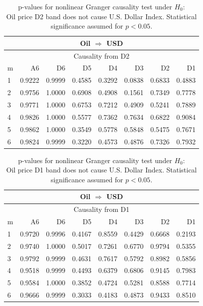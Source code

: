 %
%
\begin{table}[H]
\begin{center}
\begin{tabular}{l|r r r r r r r}
\hline\hline
\multicolumn{8}{c}{Oil $\Rightarrow$ USD}\\
\hline
\multicolumn{8}{c}{Causality from D2}\\
\hline\hline
m & A6 & D6 & D5 & D4 & D3 & D2 & D1 \\
\hline
1 & 0.9222 & 0.9999 & 0.4585 & 0.3292 & 0.0838 & 0.6833 & 0.4883 \\
2 & 0.9756 & 1.0000 & 0.6908 & 0.4908 & 0.1561 & 0.7349 & 0.7778 \\
3 & 0.9771 & 1.0000 & 0.6753 & 0.7212 & 0.4909 & 0.5241 & 0.7889 \\
4 & 0.9826 & 1.0000 & 0.5577 & 0.7362 & 0.7634 & 0.6822 & 0.9084 \\
5 & 0.9862 & 1.0000 & 0.3549 & 0.5778 & 0.5848 & 0.5475 & 0.7671 \\
6 & 0.9824 & 0.9999 & 0.3220 & 0.4573 & 0.4876 & 0.7326 & 0.7932 \\
\hline\hline
\end{tabular}
\caption{p-values for nonlinear Granger causality test under $H_0$:\\
Oil price D2 band does not cause U.S. Dollar Index. Statistical significance assumed for $p<0.05$.}
\end{center}
\end{table}

%
%
\begin{table}[H]
\begin{center}
\begin{tabular}{l|r r r r r r r}
\hline\hline
\multicolumn{8}{c}{Oil $\Rightarrow$ USD}\\
\hline
\multicolumn{8}{c}{Causality from D1}\\
\hline\hline
m & A6 & D6 & D5 & D4 & D3 & D2 & D1 \\
\hline
1 & 0.9720 & 0.9996 & 0.4167 & 0.8559 & 0.4429 & 0.6668 & 0.2193 \\
2 & 0.9740 & 1.0000 & 0.5017 & 0.7261 & 0.6770 & 0.9794 & 0.5355 \\
3 & 0.9792 & 0.9999 & 0.4631 & 0.7617 & 0.5792 & 0.8982 & 0.5856 \\
4 & 0.9518 & 0.9999 & 0.4493 & 0.6379 & 0.6806 & 0.9145 & 0.7983 \\
5 & 0.9584 & 1.0000 & 0.3852 & 0.4724 & 0.5281 & 0.8588 & 0.7714 \\
6 & 0.9666 & 0.9999 & 0.3033 & 0.4183 & 0.4873 & 0.9433 & 0.8510 \\
\hline\hline
\end{tabular}
\caption{p-values for nonlinear Granger causality test under $H_0$:\\
Oil price D1 band does not cause U.S. Dollar Index. Statistical significance assumed for $p<0.05$.}
\label{table-last}
\end{center}
\end{table}

